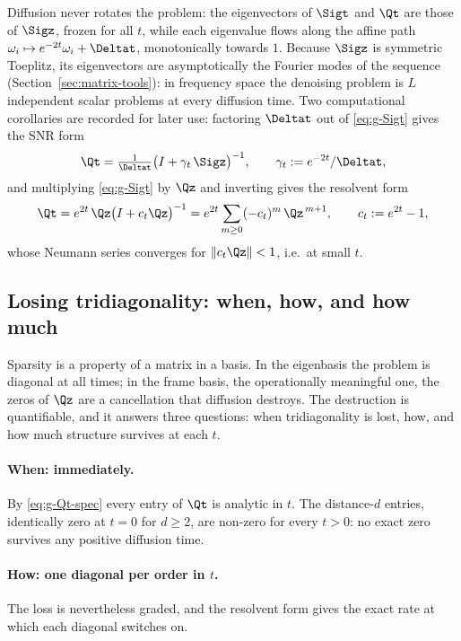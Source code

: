 Diffusion never rotates the problem: the eigenvectors of $\Sigt$ and
$\Qt$ are those of $\Sigz$, frozen for all $t$, while each eigenvalue
flows along the affine path $\omega_i \mapsto e^{-2t}\omega_i + \Deltat$,
monotonically towards $1$. Because $\Sigz$ is symmetric Toeplitz, its
eigenvectors are asymptotically the Fourier modes of the sequence
(Section~\ref{sec:matrix-tools}): in frequency space the denoising problem is $L$
independent scalar problems at every diffusion time. Two computational
corollaries are recorded for later use: factoring $\Deltat$ out of
\eqref{eq:g-Sigt} gives the SNR form
\begin{equation}
  \Qt = \tfrac{1}{\Deltat} \big( I + \gamma_t\, \Sigz \big)^{-1},
  \qquad \gamma_t := e^{-2t}/\Deltat ,
  \label{eq:g-Qt-snr}
\end{equation}
and multiplying \eqref{eq:g-Sigt} by $\Qz$ and inverting gives the
resolvent form
\begin{equation}
  \Qt = e^{2t}\, \Qz \big( I + c_t \Qz \big)^{-1}
      = e^{2t} \sum_{m \geq 0} (-c_t)^m\, \Qz^{\,m+1},
  \qquad c_t := e^{2t} - 1 ,
  \label{eq:g-Qt-res}
\end{equation}
whose Neumann series converges for $\|c_t \Qz\| < 1$, i.e.\ at small $t$.

\subsection{Losing tridiagonality: when, how, and how much}
\label{sec:g-tridiag-loss}

Sparsity is a property of a matrix in a basis. In the eigenbasis the
problem is diagonal at all times; in the frame basis, the operationally
meaningful one, the zeros of $\Qz$ are a cancellation that diffusion
destroys. The destruction is quantifiable, and it answers three questions:
when tridiagonality is lost, how, and how much structure survives at
each $t$.

\paragraph{When: immediately.} By \eqref{eq:g-Qt-spec} every entry of
$\Qt$ is analytic in $t$. The distance-$d$ entries, identically zero at
$t = 0$ for $d \geq 2$, are non-zero for every $t > 0$: no exact zero
survives any positive diffusion time.

\paragraph{How: one diagonal per order in $t$.} The loss is nevertheless
graded, and the resolvent form gives the exact rate at which each diagonal
switches on.

